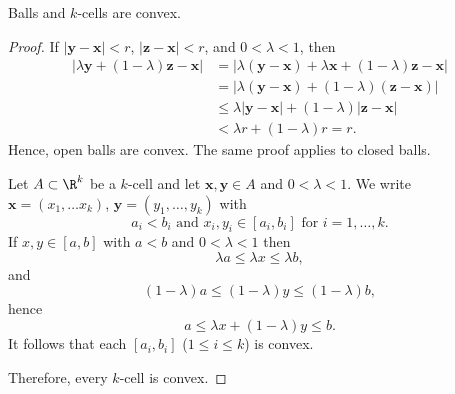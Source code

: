 \begin{example}
Balls and $k$-cells are convex.
\end{example}
\begin{proof}
If $|\mathbf{y}-\mathbf{x}|<r$, $|\mathbf{z}-\mathbf{x}|<r$, and $0<\lambda<1$, then
\begin{align*}
    |\lambda\mathbf{y}+(1-\lambda)\mathbf{z}-\mathbf{x}| &= |\lambda(\mathbf{y}-\mathbf{x})+\lambda\mathbf{x}+(1-\lambda)\mathbf{z}-\mathbf{x}| \\
    &= |\lambda(\mathbf{y}-\mathbf{x})+(1-\lambda)(\mathbf{z}-\mathbf{x})| \\
    &\leq \lambda|\mathbf{y}-\mathbf{x}|+(1-\lambda)|\mathbf{z}-\mathbf{x}| \\
    &< \lambda r + (1-\lambda)r = r.
\end{align*}
Hence, open balls are convex. 
The same proof applies to closed balls.

Let $A \subset \R^k$ be a $k$-cell and let $\mathbf{x},\mathbf{y} \in A$ and $0<\lambda<1$. 
We write $\mathbf{x}=(x_1, \ldots x_k)$, $\mathbf{y}=(y_1, \ldots, y_k)$ with
\[
a_i<b_i \text{ and } x_i, y_i \in [a_i,b_i] \text{ for } i=1, \ldots, k.
\]
If $x, y \in [a,b]$ with $a<b$ and $0<\lambda<1$ then
\[
{\lambda}a \leq {\lambda}x \leq {\lambda}b,
\]
and
\[
(1-\lambda)a \leq (1-\lambda)y \leq (1-\lambda)b,
\]
hence 
\[
a \leq {\lambda}x+(1-\lambda)y \leq b.
\]
It follows that each $[a_i, b_i]$ ($1 \leq i \leq k$) is convex.

Therefore, every $k$-cell is convex.
\end{proof}
